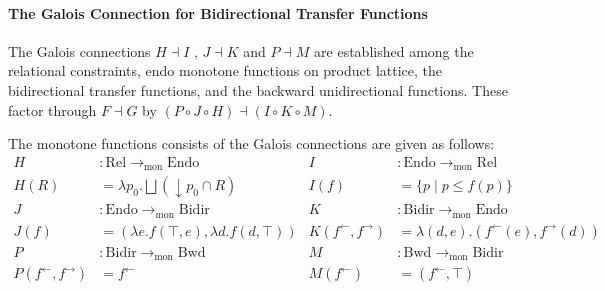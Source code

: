 \documentclass{llncs}
\newcommand{\Pow}{\mathcal{P}}
\newcommand{\Rel}{\mathrm{Rel}}
\newcommand{\Endo}{\mathrm{Endo}}
\newcommand{\Bidir}{\mathrm{Bidir}}
\newcommand{\Unidir}{\mathrm{Bwd}}
\newcommand{\tomon}{\to_{\mathrm{mon}}}
\newcommand{\ff}{{f^{\rightarrow}}}
\newcommand{\fb}{{f^{\leftarrow}}}
\newcommand{\bigjoin}{\bigsqcup}
\newcommand{\comp}{\circ}
\begin{document}
  \paragraph{The Galois Connection for Bidirectional Transfer Functions}
  The Galois connections $H \dashv I$ , $J \dashv K$ and $P \dashv M$ are established among the relational constraints, endo monotone functions on product lattice, the bidirectional transfer functions, and the backward unidirectional functions. These factor through $F \dashv G$ by $(P \comp J \comp H) \dashv (I \comp K \comp M)$.
  \begin{center}
  \end{center}
  The monotone functions consists of the Galois connections are given as follows:
  \begin{align*}
    H &: \Rel \tomon \Endo &
    I &: \Endo \tomon \Rel \\
    H(R) &= \lambda p_{0} . \bigjoin (\downarrow p_{0} \cap R) &
    I(f) &= \{p \mid p \leq f(p)\} \\
    J &: \Endo \tomon \Bidir &
    K &: \Bidir \tomon \Endo \\
    J(f) &= (\lambda e . f (\top , e ) , \lambda d . f (d , \top)) &
    K(\fb , \ff) &= \lambda (d , e) . (\fb(e) , \ff(d)) \\
    P &: \Bidir \tomon \Unidir &
    M &: \Unidir \tomon \Bidir \\
    P(\fb , \ff) &= \fb &
    M(\fb) &= (\fb , \top)
  \end{align*}
\end{document}
